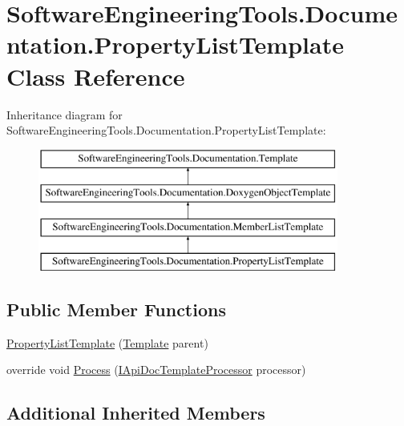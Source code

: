 \hypertarget{class_software_engineering_tools_1_1_documentation_1_1_property_list_template}{\section{Software\+Engineering\+Tools.\+Documentation.\+Property\+List\+Template Class Reference}
\label{class_software_engineering_tools_1_1_documentation_1_1_property_list_template}
}
Inheritance diagram for Software\+Engineering\+Tools.\+Documentation.\+Property\+List\+Template\+:\begin{figure}[H]
\begin{center}
\leavevmode
\includegraphics[height=4.000000cm]{class_software_engineering_tools_1_1_documentation_1_1_property_list_template}
\end{center}
\end{figure}
\subsection*{Public Member Functions}
\begin{DoxyCompactItemize}
\item 
\hyperlink{class_software_engineering_tools_1_1_documentation_1_1_property_list_template_a578e412f45023f777bde01f8970a0ba3}{Property\+List\+Template} (\hyperlink{class_software_engineering_tools_1_1_documentation_1_1_template}{Template} parent)
\item 
override void \hyperlink{class_software_engineering_tools_1_1_documentation_1_1_property_list_template_a308232062b498b6815f1925c37f65c16}{Process} (\hyperlink{interface_software_engineering_tools_1_1_documentation_1_1_i_api_doc_template_processor}{I\+Api\+Doc\+Template\+Processor} processor)
\end{DoxyCompactItemize}
\subsection*{Additional Inherited Members}


